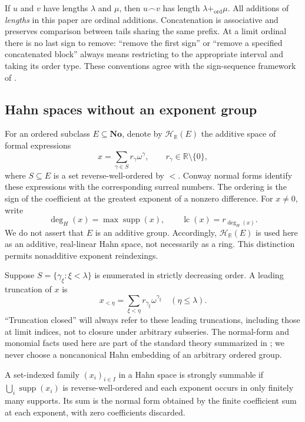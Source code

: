 \documentclass[11pt]{article}
\theoremstyle{definition}
\theoremstyle{remark}
\newcommand{\No}{\ensuremath{\mathbf{No}}}
\newcommand{\R}{\mathbb{R}}
\newcommand{\supp}{\operatorname{supp}}
\newcommand{\cat}{\mathbin{\frown}}
\newcommand{\Hahn}[2]{\mathcal{H}_{#1}(#2)}
\newcommand{\lc}{\operatorname{lc}}
\newcommand{\hdeg}{\operatorname{deg}_{H}}
\begin{document}
If $u$ and $v$ have lengths $\lambda$ and $\mu$, then
$u\cat v$ has length $\lambda+_{\mathrm{ord}}\mu$. All additions of
\emph{lengths} in this paper are ordinal additions. Concatenation is
associative and preserves comparison between tails sharing the same
prefix. At a limit ordinal there is no last sign to remove: ``remove the
first sign'' or ``remove a specified concatenated block'' always means
restricting to the appropriate interval and taking its order type.
These conventions agree with the sign-sequence framework of
\cite{BagHoeven}.

\subsection{Hahn spaces without an exponent group}
For an ordered subclass $E\subseteq\No$, denote by $\Hahn{\R}{E}$
the additive space of formal expressions
\begin{equation}\label{isg:eq:nf}
 x=\sum_{\gamma\in S} r_\gamma\omega^\gamma,
 \qquad r_\gamma\in\R\setminus\{0\},
\end{equation}
where $S\subseteq E$ is a set reverse-well-ordered by $<$.
Conway normal forms identify these expressions with the corresponding
surreal numbers. The ordering is the sign of the coefficient at the
greatest exponent of a nonzero difference. For $x\ne0$, write
\[
 \hdeg(x)=\max\supp(x),\qquad
 \lc(x)=r_{\hdeg(x)}.
\]
We do not assert that $E$ is an additive group. Accordingly,
$\Hahn{\R}{E}$ is used here as an additive, real-linear Hahn space, not
necessarily as a ring. This distinction permits nonadditive exponent
reindexings.

Suppose $S=\{\gamma_\xi:\xi<\lambda\}$ is enumerated in strictly
decreasing order. A leading truncation of $x$ is
\[
 x_{<\eta}=\sum_{\xi<\eta}r_{\gamma_\xi}\omega^{\gamma_\xi}
 \quad(\eta\le\lambda).
\]
``Truncation closed'' will always refer to these leading truncations,
including those at limit indices, not to closure under arbitrary
subseries. The normal-form and monomial facts used here are part of the
standard theory summarized in \cite{EK}; we never choose a noncanonical
Hahn embedding of an arbitrary ordered group.

\begin{definition}\label{isg:def:strong}
A set-indexed family $(x_i)_{i\in I}$ in a Hahn space is strongly
summable if $\bigcup_i\supp(x_i)$ is reverse-well-ordered and each
exponent occurs in only finitely many supports. Its sum is the normal
form obtained by the finite coefficient sum at each exponent, with zero
coefficients discarded.
\end{definition}
\end{document}
